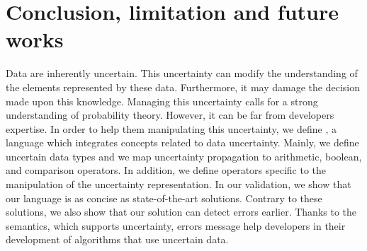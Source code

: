 \section{Conclusion, limitation and future works}
\label{sec:conclusion}

Data are inherently uncertain.
This uncertainty can modify the understanding of the elements represented by these data.
Furthermore, it may damage the decision made upon this knowledge.
Managing this uncertainty calls for a strong understanding of probability theory.
However, it can be far from developers expertise.
In order to help them manipulating this uncertainty, we define \langName{}, a language which integrates concepts related to data uncertainty.
Mainly, we define uncertain data types and we map uncertainty propagation to arithmetic, boolean, and comparison operators.
In addition, we define operators specific to the manipulation of the uncertainty representation.
In our validation, we show that our language is as concise as state-of-the-art solutions.
Contrary to these solutions, we also show that our solution can detect errors earlier.
Thanks to the semantics, which supports uncertainty, errors message help developers in their development of algorithms that use uncertain data.


